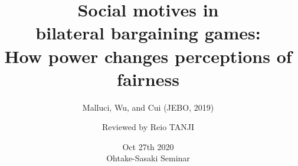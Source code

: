\documentclass[dvipdfmx,11pt]{beamer}
\title{Social motives in \\ bilateral bargaining games: \\ How power changes perceptions of fairness}
\subtitle{Malluci, Wu, and Cui (JEBO, 2019)}
\author{Reviewed by Reio TANJI}
\date{Oct 27th 2020 \\ Ohtake-Sasaki Seminar}
\institute{Osaka University, Graduate School of Economics}
\begin{document}
\begin{frame}\frametitle{}
\titlepage
\end{frame}


\begin{frame}\frametitle{}

\end{frame}
\end{document}
